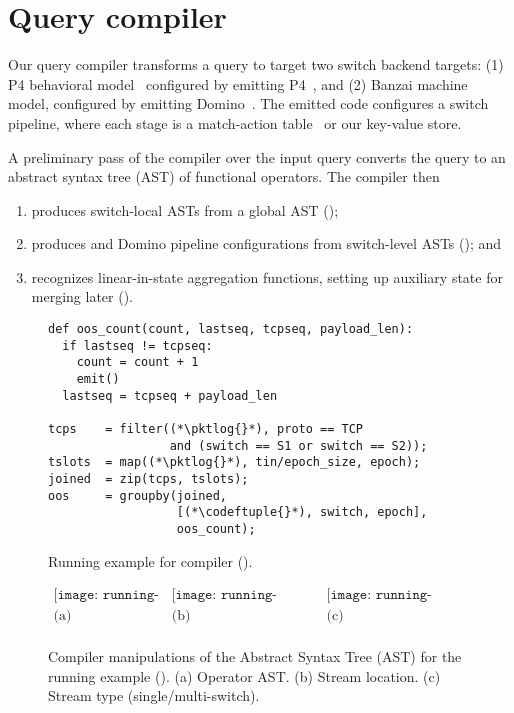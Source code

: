 \section{Query compiler}
\label{sec:compiler}

Our query compiler transforms a \TheSystem query to target two switch backend
targets: (1) P4 behavioral model~\cite{p4-bmv2} configured by emitting
P4~\cite{p4}, and (2) Banzai machine model, configured by emitting
Domino~\cite{domino_sigcomm}. The emitted code configures a switch pipeline,
where each stage is a match-action table~\cite{openflow} or our key-value store.

A preliminary pass of the compiler over the input query converts the query to an
abstract syntax tree (AST) of functional operators. The compiler then
\begin{enumerate}
\item produces switch-local ASTs from a global AST
  ();
\item produces \pfs and Domino pipeline configurations from switch-level ASTs
  (); and
\item recognizes linear-in-state aggregation functions, setting up
  auxiliary state for merging later ().
\end{enumerate}

\begin{figure}[!t]{
\figcodesize
\begin{lstlisting}
def oos_count(count, lastseq, tcpseq, payload_len):
  if lastseq != tcpseq:
    count = count + 1
    emit()
  lastseq = tcpseq + payload_len

tcps    = filter((*\pktlog{}*), proto == TCP
                 and (switch == S1 or switch == S2));
tslots  = map((*\pktlog{}*), tin/epoch_size, epoch);
joined  = zip(tcps, tslots);
oos     = groupby(joined,
                  [(*\codeftuple{}*), switch, epoch],
                  oos_count);
\end{lstlisting}
}
\caption{Running example for \TheSystem compiler ().}
\label{fig:running-example-code}
\end{figure}

\begin{figure}
  \centering
  \[
  \begin{array}{ccc}
    \texttt{[image: running-example-AST.pdf]} &
    \texttt{[image: running-example-annotated-AST-2.pdf]} &
    \texttt{[image: running-example-annotated-AST.pdf]}
    \\
    \mbox{(a)} & \mbox{(b)} & \mbox{(c)} \\
  \end{array}
  \]
\caption{Compiler manipulations of the Abstract Syntax Tree (AST) for the
  running example (). (a) Operator AST. (b) Stream
  location. (c) Stream type (single/multi-switch).}
\label{fig:compiler-ast-manipulations}
\end{figure}

